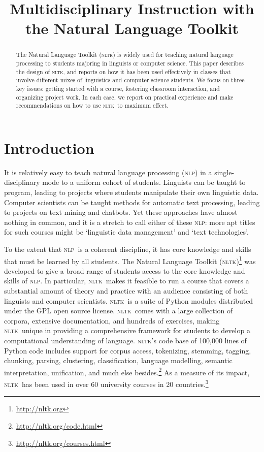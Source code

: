 \documentclass[11pt]{article}
\title{Multidisciplinary Instruction with the Natural Language Toolkit}
\author{}
\date{}
\newcommand{\NLP}{\textsc{nlp}}
\newcommand{\NLTK}{\textsc{nltk}}
\begin{document}
\maketitle
\begin{abstract}
  The Natural Language Toolkit (\NLTK) is widely used for teaching
  natural language processing to students majoring in linguists or
  computer science.  This paper describes the design of \NLTK, and
  reports on how it has been used effectively in classes that involve
  different mixes of
  linguistics and computer science students.  We focus
  on three key issues: getting started with a course, fostering
  classroom interaction, and organizing project work.
  In each case, we report on practical experience and make
  recommendations on how to use \NLTK\ to maximum effect.
\end{abstract}

\section{Introduction}

It is relatively easy to teach natural language processing (\NLP) in a
single-disciplinary mode to a uniform cohort of students.  Linguists
can be taught to program, leading to projects where students
manipulate their own linguistic data.  Computer scientists can be
taught methods for automatic text processing, leading to projects on
text mining and chatbots.  Yet these approaches have almost nothing in
common, and it is a stretch to call either of these \NLP: more apt
titles for such courses might be `linguistic data management' and
`text technologies'.

To the extent that \NLP\ is a coherent discipline, it has core
knowledge and skills that must be learned by all students.  The
Natural Language Toolkit (\NLTK)\footnote{\url{http://nltk.org}} was
developed to give a broad range of students access to the core
knowledge and skills of \NLP.  In particular, \NLTK\ makes it feasible
to run a course that covers a substantial amount of theory and
practice with an audience consisting of both linguists and computer
scientists.  \NLTK\ is a suite of Python modules distributed under the
GPL open source license.  \NLTK\ comes with a large collection of
corpora, extensive documentation, and hundreds of exercises, making
\NLTK\ unique in providing a comprehensive framework for students to
develop a computational understanding of language.  \NLTK's code base
of 100,000 lines of Python code includes support for corpus access,
tokenizing, stemming, tagging, chunking, parsing, clustering,
classification, language modelling, semantic interpretation,
unification, and much else
besides.\footnote{\url{http://nltk.org/code.html}} As a measure of its
impact, \NLTK\ has been used in over 60 university courses in 20
countries.\footnote{\url{http://nltk.org/courses.html}}
\end{document}
